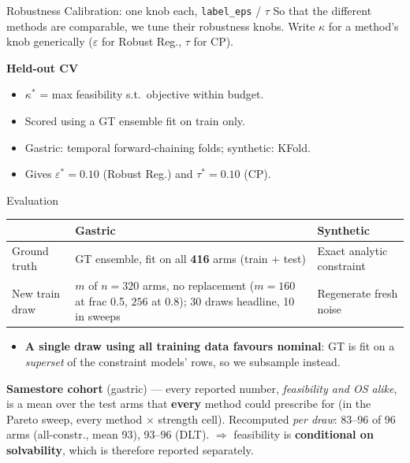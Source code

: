 \documentclass{beamer}
\begin{document}
\begin{frame}{Robustness Calibration: one knob each, \texttt{label\_eps} / $\tau$}
  So that the different methods are comparable, we tune their robustness knobs.
  Write $\kappa$ for a method's knob generically ($\varepsilon$ for Robust Reg., $\tau$ for CP).
  \medskip

  \textbf{Held-out CV}
  \begin{itemize}
    \item $\kappa^\ast$ = max feasibility s.t.\ objective within budget.
    \item Scored using a GT ensemble fit on train only.
    \item Gastric: temporal forward-chaining folds; synthetic: KFold.
    \item Gives $\varepsilon^\ast=0.10$ (Robust Reg.) and $\tau^\ast=0.10$ (CP).
  \end{itemize}
\end{frame}

\begin{frame}{Evaluation}
  \small
  \begin{center}
  \begin{tabular}{@{}>{\raggedright\arraybackslash}p{2.6cm}>{\raggedright\arraybackslash}p{4.0cm}>{\raggedright\arraybackslash}p{4.0cm}@{}}
    \toprule
    & Gastric & Synthetic \\
    \midrule
    Ground truth & GT ensemble, fit on all \textbf{416} arms (train + test) & Exact analytic constraint \\[0.3em]
    New train draw & $m$ of $n=320$ arms, no replacement
      ($m=160$ at frac 0.5, $256$ at 0.8); 30 draws headline, 10 in sweeps
      & Regenerate fresh noise \\
    \bottomrule
  \end{tabular}
  \end{center}
  \begin{itemize}
    \item \textbf{A single draw using all training data favours nominal}: GT is fit on a
      \emph{superset} of the constraint models' rows, so we subsample instead.
  \end{itemize}
  \medskip
  \footnotesize
  \textbf{Samestore cohort} (gastric) --- every reported number, \emph{feasibility and
  OS alike}, is a mean over the test arms that \textbf{every} method could prescribe
  for (in the Pareto sweep, every method $\times$ strength cell). Recomputed
  \emph{per draw}: 83--96 of 96 arms (all-constr., mean 93), 93--96 (DLT).
  $\Rightarrow$ feasibility is \textbf{conditional on solvability}, which is therefore
  reported separately.
\end{frame}
\end{document}
